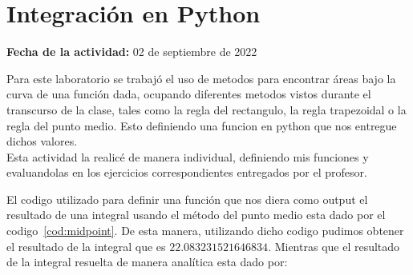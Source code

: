 \documentclass[../portafolio.tex]{subfiles}
\begin{document}


\section{Integraci\'on en Python}   %

\hfill \textbf{Fecha de la actividad:} 02 de septiembre de 2022

\medskip

Para este laboratorio se trabaj\'o el uso de metodos para encontrar \'areas bajo la curva de una funci\'on dada, ocupando diferentes metodos vistos durante el transcurso de la clase, tales como la regla del rectangulo, la regla trapezoidal o la regla del punto medio. Esto definiendo una funcion en python que nos entregue dichos valores.\\
Esta actividad la realic\'e de manera individual, definiendo mis funciones y evaluandolas en los ejercicios correspondientes entregados por el profesor.

El codigo utilizado para definir una funci\'on que nos diera como output el resultado de una integral usando el m\'etodo del punto medio esta dado por el codigo~\ref{cod:midpoint}. De esta manera, utilizando dicho codigo pudimos obtener el resultado de la integral que es $22.083231521646834$. Mientras que el resultado de la integral resuelta de manera anal\'itica esta dado por:
\end{document}

